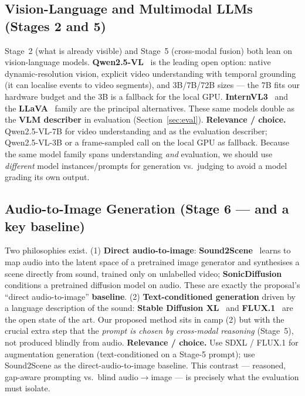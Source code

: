 \documentclass[11pt,a4paper]{article}
\begin{document}
\subsection{Vision-Language and Multimodal LLMs (Stages 2 and 5)}
Stage~2 (what is already visible) and Stage~5 (cross-modal fusion) both lean on vision-language
models. \textbf{Qwen2.5-VL}~\cite{qwenvl} is the leading open option: native dynamic-resolution
vision, explicit video understanding with temporal grounding (it can localise events to video
segments), and 3B/7B/72B sizes --- the 7B fits our hardware budget and the 3B is a fallback for the
local GPU. \textbf{InternVL3}~\cite{internvl} and the \textbf{LLaVA}~\cite{llava} family are the
principal alternatives. These same models double as the \textbf{VLM describer} in evaluation
(Section~\ref{sec:eval}).
\textbf{Relevance / choice.} Qwen2.5-VL-7B for video understanding and as the evaluation describer;
Qwen2.5-VL-3B or a frame-sampled call on the local GPU as fallback. Because the same model family
spans understanding \emph{and} evaluation, we should use \emph{different} model instances/prompts
for generation vs.\ judging to avoid a model grading its own output.

\subsection{Audio-to-Image Generation (Stage 6 --- and a key baseline)}
Two philosophies exist. (1) \textbf{Direct audio-to-image}: \textbf{Sound2Scene}~\cite{sound2scene}
learns to map audio into the latent space of a pretrained image generator and synthesises a scene
directly from sound, trained only on unlabelled video; \textbf{SonicDiffusion}~\cite{sonicdiffusion}
conditions a pretrained diffusion model on audio. These are exactly the proposal's ``direct
audio-to-image'' \textbf{baseline}. (2) \textbf{Text-conditioned generation} driven by a
language description of the sound: \textbf{Stable Diffusion XL}~\cite{sdxl} and
\textbf{FLUX.1}~\cite{flux} are the open state of the art. Our proposed method sits in camp (2) but
with the crucial extra step that the \emph{prompt is chosen by cross-modal reasoning} (Stage~5),
not produced blindly from audio.
\textbf{Relevance / choice.} Use SDXL / FLUX.1 for augmentation generation (text-conditioned on a
Stage-5 prompt); use Sound2Scene as the direct-audio-to-image baseline. This contrast --- reasoned,
gap-aware prompting vs.\ blind audio$\to$image --- is precisely what the evaluation must isolate.
\end{document}
